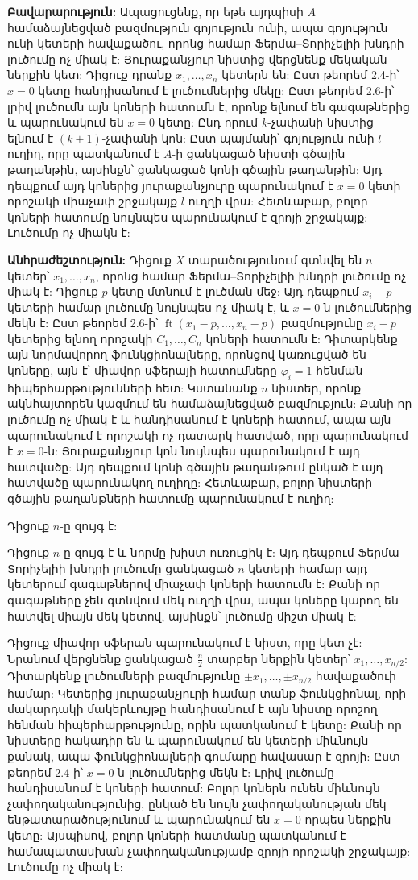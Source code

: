 \documentclass[12pt,a4paper]{article}
\numberwithin{equation}{section}
\numberwithin{figure}{section}
\begin{document}
\textbf{Բավարարություն:} Ապացուցենք, որ եթե այդպիսի $A$ համաձայնեցված բազմություն գոյություն ունի, ապա գոյություն ունի կետերի հավաքածու, որոնց համար Ֆերմա--Տորիչելիի խնդրի լուծումը ոչ միակ է: Յուրաքանչյուր նիստից վերցնենք մեկական ներքին կետ: Դիցուք դրանք $x_1, \dots, x_n$ կետերն են: Ըստ թեորեմ 2.4-ի՝ $x = 0$ կետը հանդիսանում է լուծումներից մեկը: Ըստ թեորեմ 2.6-ի՝ լրիվ լուծումն այն կոների հատումն է, որոնք ելնում են գագաթներից և պարունակում են $x = 0$ կետը: Ընդ որում $k$-չափանի նիստից ելնում է $(k+1)$-չափանի կոն: Ըստ պայմանի՝ գոյություն ունի $l$ ուղիղ, որը պատկանում է $A$-ի ցանկացած նիստի գծային թաղանթին, այսինքն՝ ցանկացած կոնի գծային թաղանթին: Այդ դեպքում այդ կոներից յուրաքանչյուրը պարունակում է $x = 0$ կետի որոշակի միաչափ շրջակայք $l$ ուղղի վրա: Հետևաբար, բոլոր կոների հատումը նույնպես պարունակում է զրոյի շրջակայք: Լուծումը ոչ միակն է:

\textbf{Անհրաժեշտություն:} Դիցուք $X$ տարածությունում գտնվել են $n$ կետեր՝ $x_1, \dots, x_n$, որոնց համար Ֆերմա--Տորիչելիի խնդրի լուծումը ոչ միակ է: Դիցուք $p$ կետը մտնում է լուծման մեջ: Այդ դեպքում $x_i - p$ կետերի համար լուծումը նույնպես ոչ միակ է, և $x = 0$-ն լուծումներից մեկն է: Ըստ թեորեմ 2.6-ի՝ $\operatorname{ft}(x_1 - p, \dots, x_n - p)$ բազմությունը $x_i - p$ կետերից ելնող որոշակի $C_1, \dots, C_n$ կոների հատումն է: Դիտարկենք այն նորմավորող ֆունկցիոնալները, որոնցով կառուցված են կոները, այն է՝ միավոր սֆերայի հատումները $\varphi_i = 1$ հենման հիպերհարթությունների հետ: Կստանանք $n$ նիստեր, որոնք ակնհայտորեն կազմում են համաձայնեցված բազմություն: Քանի որ լուծումը ոչ միակ է և հանդիսանում է կոների հատում, ապա այն պարունակում է որոշակի ոչ դատարկ հատված, որը պարունակում է $x = 0$-ն: Յուրաքանչյուր կոն նույնպես պարունակում է այդ հատվածը: Այդ դեպքում կոնի գծային թաղանթում ընկած է այդ հատվածը պարունակող ուղիղը: Հետևաբար, բոլոր նիստերի գծային թաղանթների հատումը պարունակում է ուղիղ:

Դիցուք $n$-ը զույգ է:

Դիցուք $n$-ը զույգ է և նորմը խիստ ուռուցիկ է: Այդ դեպքում Ֆերմա--Տորիչելիի խնդրի լուծումը ցանկացած $n$ կետերի համար այդ կետերում գագաթներով միաչափ կոների հատումն է: Քանի որ գագաթները չեն գտնվում մեկ ուղղի վրա, ապա կոները կարող են հատվել միայն մեկ կետով, այսինքն՝ լուծումը միշտ միակ է:

Դիցուք միավոր սֆերան պարունակում է նիստ, որը կետ չէ: Նրանում վերցնենք ցանկացած $\frac{n}{2}$ տարբեր ներքին կետեր՝ $x_1, \dots, x_{n/2}$: Դիտարկենք լուծումների բազմությունը $\pm x_1, \dots, \pm x_{n/2}$ հավաքածուի համար: Կետերից յուրաքանչյուրի համար տանք ֆունկցիոնալ, որի մակարդակի մակերևույթը հանդիսանում է այն նիստը որոշող հենման հիպերհարթությունը, որին պատկանում է կետը: Քանի որ նիստերը հակադիր են և պարունակում են կետերի միևնույն քանակ, ապա ֆունկցիոնալների գումարը հավասար է զրոյի: Ըստ թեորեմ 2.4-ի՝ $x = 0$-ն լուծումներից մեկն է: Լրիվ լուծումը հանդիսանում է կոների հատում: Բոլոր կոներն ունեն միևնույն չափողականությունից, ընկած են նույն չափողականության մեկ ենթատարածությունում և պարունակում են $x = 0$ որպես ներքին կետը: Այսպիսով, բոլոր կոների հատմանը պատկանում է համապատասխան չափողականությամբ զրոյի որոշակի շրջակայք: Լուծումը ոչ միակ է:
\end{document}
